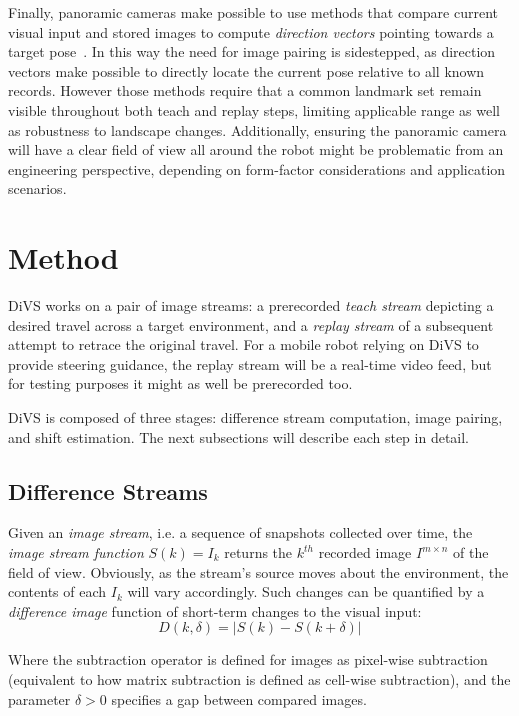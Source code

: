 \documentclass[twocolumn, 9pt,fleqn]{jsproceedings}
\begin{document}
Finally, panoramic cameras make possible to use methods that compare current visual input and stored images to compute \textit{direction vectors} pointing towards a target pose~\cite{LAM00,VAR05}. In this way the need for image pairing is sidestepped, as direction vectors make possible to directly locate the current pose relative to all known records. However those methods require that a common landmark set remain visible throughout both teach and replay steps, limiting applicable range as well as robustness to landscape changes. Additionally, ensuring the panoramic camera will have a clear field of view all around the robot might be problematic from an engineering perspective, depending on form-factor considerations and application scenarios.

\section{Method}

DiVS works on a pair of image streams: a prerecorded \textit{teach stream} depicting a desired travel across a target environment, and a \textit{replay stream} of a subsequent attempt to retrace the original travel. For a mobile robot relying on DiVS to provide steering guidance, the replay stream will be a real-time video feed, but for testing purposes it might as well be prerecorded too.

DiVS is composed of three stages: difference stream computation, image pairing, and shift estimation. The next subsections will describe each step in detail.

\subsection{Difference Streams}

Given an \textit{image stream}, i.e. a sequence of snapshots collected over time, the \textit{image stream function} $S(k) = I_k$ returns the $k^{th}$ recorded image $I^{m \times n}$ of the field of view. Obviously, as the stream's source moves about the environment, the contents of each $I_k$ will vary accordingly. Such changes can be quantified by a \textit{difference image} function of short-term changes to the visual input:
\begin{equation}
D(k, \delta) = | S(k) - S(k + \delta) |
\end{equation}

Where the subtraction operator is defined for images as pixel-wise subtraction (equivalent to how matrix subtraction is defined as cell-wise subtraction), and the parameter $\delta > 0$ specifies a gap between compared images.
\end{document}
